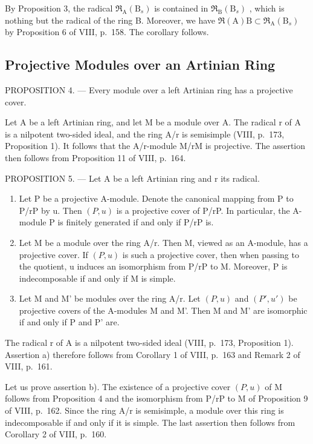 By Proposition 3, the radical \(\mathfrak{R}_{\mathrm{A}}(\mathrm{B}_{s})\) is contained in \(\mathfrak{R}_{\mathrm{B}}(\mathrm{B}_{s})\) , which is nothing but the radical of the ring B. Moreover, we have \(\mathfrak{R}(\mathrm{A})\mathrm{B}\subset\mathfrak{R}_{\mathrm{A}}(\mathrm{B}_{s})\) by Proposition 6 of VIII, p.~158. The corollary follows.

\subsection{Projective Modules over an Artinian Ring}

PROPOSITION 4. --- Every module over a left Artinian ring has a projective cover.

Let A be a left Artinian ring, and let M be a module over A. The radical r of A is a nilpotent two-sided ideal, and the ring A/r is semisimple (VIII, p.~173, Proposition 1). It follows that the A/r-module M/rM is projective. The assertion then follows from Proposition 11 of VIII, p.~164.

PROPOSITION 5. --- Let A be a left Artinian ring and r its radical.

\begin{enumerate}
\def\labelenumi{\alph{enumi})}
\item
  Let P be a projective A-module. Denote the canonical mapping from P to P/rP by u. Then \((P,u)\) is a projective cover of P/rP. In particular, the A-module P is finitely generated if and only if P/rP is.
\item
  Let M be a module over the ring A/r. Then M, viewed as an A-module, has a projective cover. If \((P,u)\) is such a projective cover, then when passing to the quotient, u induces an isomorphism from P/rP to M. Moreover, P is indecomposable if and only if M is simple.
\item
  Let M and M' be modules over the ring A/r. Let \((P, u)\) and \((P', u')\) be projective covers of the A-modules M and M'. Then M and M' are isomorphic if and only if P and P' are.
\end{enumerate}

The radical r of A is a nilpotent two-sided ideal (VIII, p.~173, Proposition 1). Assertion a) therefore follows from Corollary 1 of VIII, p.~163 and Remark 2 of VIII, p.~161.

Let us prove assertion b). The existence of a projective cover \((P, u)\) of M follows from Proposition 4 and the isomorphism from P/rP to M of Proposition 9 of VIII, p.~162. Since the ring A/r is semisimple, a module over this ring is indecomposable if and only if it is simple. The last assertion then follows from Corollary 2 of VIII, p.~160.

